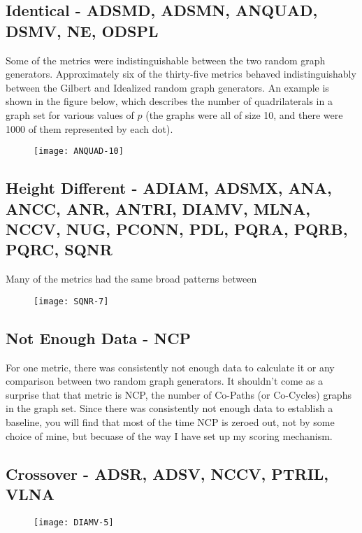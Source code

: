 \subsection*{Identical - ADSMD, ADSMN, ANQUAD, DSMV, NE, ODSPL} 
Some of the metrics were indistinguishable between the two random graph generators.
Approximately six of the thirty-five metrics behaved indistinguishably between the Gilbert and Idealized random graph generators.
An example is shown in the figure below, which describes the number of quadrilaterals in a graph set for various values of $p$ (the graphs were all of size 10, and there were 1000 of them represented by each dot).

\begin{figure}[h]
\label{fig:anquad10}
\caption{}
\centering
\texttt{[image: ANQUAD-10]}
\end{figure}

\subsection*{Height Different - ADIAM, ADSMX, ANA, ANCC, ANR, ANTRI, DIAMV, MLNA, NCCV, NUG, PCONN, PDL, PQRA, PQRB, PQRC, SQNR} 
Many of the metrics had the same broad patterns between 

\begin{figure}[h]
\label{fig:sqnr7}
\caption{}
\centering
\texttt{[image: SQNR-7]}
\end{figure}

\subsection*{Not Enough Data - NCP}
For one metric, there was consistently not enough data to calculate it or any comparison between two random graph generators.
It shouldn't come as a surprise that that metric is NCP, the number of Co-Paths (or Co-Cycles) graphs in the graph set. 
Since there was consistently not enough data to establish a baseline, you will find that most of the time NCP is zeroed out, not by some choice of mine, but becuase of the way I have set up  my scoring mechanism.

\subsection*{Crossover - ADSR, ADSV, NCCV, PTRIL, VLNA}

\begin{figure}[h]
\label{fig:diamv5}
\caption{}
\centering
\texttt{[image: DIAMV-5]}
\end{figure}

